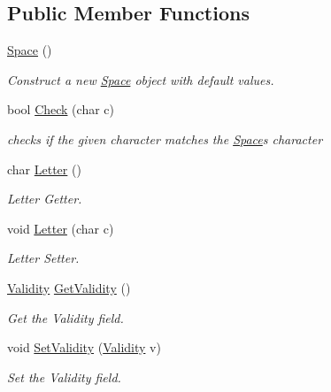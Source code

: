 \subsection*{Public Member Functions}
\begin{DoxyCompactItemize}
\item 
\mbox{\label{classgame_1_1objects_1_1Space_ac91aa556c22892e1e302744e0fd66873}} 
\hyperlink{classgame_1_1objects_1_1Space_ac91aa556c22892e1e302744e0fd66873}{Space} ()
\begin{DoxyCompactList}\small\item\em Construct a new \hyperlink{classgame_1_1objects_1_1Space}{Space} object with default values. \end{DoxyCompactList}\item 
bool \hyperlink{classgame_1_1objects_1_1Space_a3fe6ab73a208e58462a5883b398bc994}{Check} (char c)
\begin{DoxyCompactList}\small\item\em checks if the given character matches the \hyperlink{classgame_1_1objects_1_1Space}{Space}\textquotesingle{}s character \end{DoxyCompactList}\item 
char \hyperlink{classgame_1_1objects_1_1Space_a09d18080892a9c6d4d84ad2c81819a5e}{Letter} ()
\begin{DoxyCompactList}\small\item\em Letter Getter. \end{DoxyCompactList}\item 
void \hyperlink{classgame_1_1objects_1_1Space_a93ee0033d8184fac73533faca731fb08}{Letter} (char c)
\begin{DoxyCompactList}\small\item\em Letter Setter. \end{DoxyCompactList}\item 
\hyperlink{Validity_8h_acb8ce664e8a953fe8c27d7f0b37cbca4}{Validity} \hyperlink{classgame_1_1objects_1_1Space_a4d4114b0deca499cfe9ef6b5e3bdddc6}{Get\+Validity} ()
\begin{DoxyCompactList}\small\item\em Get the Validity field. \end{DoxyCompactList}\item 
void \hyperlink{classgame_1_1objects_1_1Space_a336887def7a71ac60ccfd2bb4a375df7}{Set\+Validity} (\hyperlink{Validity_8h_acb8ce664e8a953fe8c27d7f0b37cbca4}{Validity} v)
\begin{DoxyCompactList}\small\item\em Set the Validity field. \end{DoxyCompactList}\item 

\end{DoxyCompactItemize}
